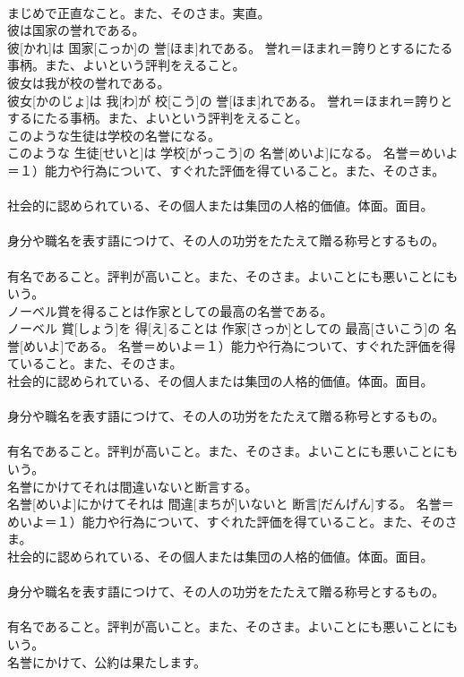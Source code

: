 \documentclass[8pt]{extreport}
\begin{document}
\begin{CJK}{UTF8}{min}
{\\	まじめで正直なこと。また、そのさま。実直。
\\	彼は国家の誉れである。	
\\	彼[かれ]は 国家[こっか]の 誉[ほま]れである。	誉れ＝ほまれ＝誇りとするにたる事柄。また、よいという評判をえること。
\\	彼女は我が校の誉れである。	
\\	彼女[かのじょ]は 我[わ]が 校[こう]の 誉[ほま]れである。	誉れ＝ほまれ＝誇りとするにたる事柄。また、よいという評判をえること。
\\	このような生徒は学校の名誉になる。	
\\	このような 生徒[せいと]は 学校[がっこう]の 名誉[めいよ]になる。	名誉＝めいよ＝１）能力や行為について、すぐれた評価を得ていること。また、そのさま。 　　　　　　　
\\	社会的に認められている、その個人または集団の人格的価値。体面。面目。 　　　　　　　
\\	身分や職名を表す語につけて、その人の功労をたたえて贈る称号とするもの。 　　　　　　　
\\	有名であること。評判が高いこと。また、そのさま。よいことにも悪いことにもいう。
\\	ノーベル賞を得ることは作家としての最高の名誉である。	
\\	ノーベル 賞[しょう]を 得[え]ることは 作家[さっか]としての 最高[さいこう]の 名誉[めいよ]である。	名誉＝めいよ＝１）能力や行為について、すぐれた評価を得ていること。また、そのさま。 　　　　　　　
\\	社会的に認められている、その個人または集団の人格的価値。体面。面目。 　　　　　　　
\\	身分や職名を表す語につけて、その人の功労をたたえて贈る称号とするもの。 　　　　　　　
\\	有名であること。評判が高いこと。また、そのさま。よいことにも悪いことにもいう。
\\	名誉にかけてそれは間違いないと断言する。	
\\	名誉[めいよ]にかけてそれは 間違[まちが]いないと 断言[だんげん]する。	名誉＝めいよ＝１）能力や行為について、すぐれた評価を得ていること。また、そのさま。 　　　　　　　
\\	社会的に認められている、その個人または集団の人格的価値。体面。面目。 　　　　　　　
\\	身分や職名を表す語につけて、その人の功労をたたえて贈る称号とするもの。 　　　　　　　
\\	有名であること。評判が高いこと。また、そのさま。よいことにも悪いことにもいう。
\\	名誉にかけて、公約は果たします。	
}
\end{CJK}
\end{document}
